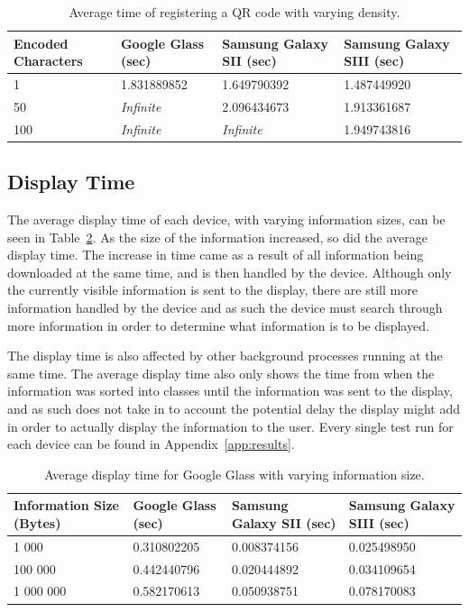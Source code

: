 	\begin{table}[H]%
    		\caption{Average time of registering a QR code with varying density.} \label{tab:complexityAverage}
		\centering \begin{tabularx}{\textwidth}{l|X|X|X} \hline
		\textbf{Encoded Characters} & \textbf{Google Glass (sec)} & \textbf{Samsung Galaxy SII (sec)} & \textbf{Samsung Galaxy SIII (sec)} \\ \hline \hline
       
		1	&1.831889852	&1.649790392	&1.487449920	\\ \hline
		50	&\textit{Infinite}	&2.096434673	&1.913361687	\\ \hline
		100	&\textit{Infinite}	&\textit{Infinite}	&1.949743816	\\ \hline
		
		\end{tabularx}
	\end{table}

\subsection{Display Time}

The average display time of each device, with varying information sizes, can be seen in Table~\ref{tab:averageDisplaySpeedGoogleGlass}. As the size of the information increased, so did the average display time. The increase in time came as a result of all information being downloaded at the same time, and is then handled by the device. Although only the currently visible information is sent to the display, there are still more information handled by the device and as such the device must search through more information in order to determine what information is to be displayed. 

The display time is also affected by other background processes running at the same time. The average display time also only shows the time from when the information was sorted into classes until the information was sent to the display, and as such does not take in to account the potential delay the display might add in order to actually display the information to the user. Every single test run for each device can be found in Appendix~\ref{app:results}.

	\begin{table}[ht!]
    		\caption{Average display time for Google Glass with varying information size.} \label{tab:averageDisplaySpeedGoogleGlass}
		\centering \begin{tabularx}{\textwidth}{l|X|X|X} \hline
		\textbf{Information Size (Bytes)} & \textbf{Google Glass (sec)}  & \textbf{Samsung Galaxy SII (sec)}  & \textbf{Samsung Galaxy SIII (sec)} \\ \hline \hline
       
		1 000	&0.310802205	&0.008374156	&0.025498950	 \\ \hline
		100 000 	&0.442440796	&0.020444892	&0.034109654	 \\ \hline
		1 000 000	&0.582170613	&0.050938751	&0.078170083	 \\ \hline

		\end{tabularx}
	\end{table}


